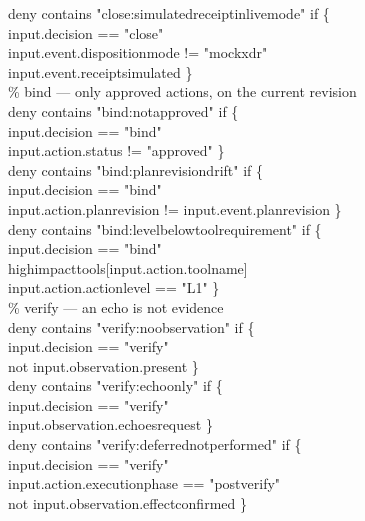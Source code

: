 \documentclass[acmsmall,manuscript,review,anonymous]{acmart}
\renewcommand{\_}{\discretionary{\textunderscore}{}{\textunderscore}}
\begin{document}
\begin{flushleft}
deny contains "close:simulated\_receipt\_in\_live\_mode" if \{\\
\quad input.decision == "close"\\
\quad input.event.disposition\_mode != "mock\_xdr"\\
\quad input.event.receipt\_simulated \}\\
\vspace{1pt}
\% bind --- only approved actions, on the current revision\\
deny contains "bind:not\_approved" if \{\\
\quad input.decision == "bind"\\
\quad input.action.status != "approved" \}\\
\vspace{1pt}
deny contains "bind:plan\_revision\_drift" if \{\\
\quad input.decision == "bind"\\
\quad input.action.plan\_revision != input.event.plan\_revision \}\\
\vspace{1pt}
deny contains "bind:level\_below\_tool\_requirement" if \{\\
\quad input.decision == "bind"\\
\quad high\_impact\_tools[input.action.tool\_name]\\
\quad input.action.action\_level == "L1" \}\\
\vspace{1pt}
\% verify --- an echo is not evidence\\
deny contains "verify:no\_observation" if \{\\
\quad input.decision == "verify"\\
\quad not input.observation.present \}\\
\vspace{1pt}
deny contains "verify:echo\_only" if \{\\
\quad input.decision == "verify"\\
\quad input.observation.echoes\_request \}\\
\vspace{1pt}
deny contains "verify:deferred\_not\_performed" if \{\\
\quad input.decision == "verify"\\
\quad input.action.execution\_phase == "post\_verify"\\
\quad not input.observation.effect\_confirmed \}\\
\vspace{1pt}

\end{flushleft}
\end{document}
